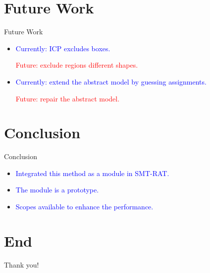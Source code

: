 \documentclass[]{beamer}
\begin{document}

\section{Future Work}
\begin{frame}{Future Work}
    \begin{itemize}
        \item \textcolor<1>{blue}{Currently: ICP excludes boxes.}\newline
        
        \textcolor<1>{red}{Future: exclude regions different shapes.}
        \bigskip
        \bigskip
        \item \textcolor<2>{blue}{Currently: extend the abstract model by guessing assignments.}\newline
        
        \textcolor<2>{red}{Future: repair the abstract model.}
    \end{itemize} 
\end{frame}

\section{Conclusion}
\begin{frame}{Conclusion}
    \begin{itemize}
        \item \textcolor<1>{blue}{Integrated this method as a module in SMT-RAT.}
        \bigskip
        \item \textcolor<1>{blue}{The module is a prototype.}
        \bigskip
        \item \textcolor<1>{blue}{Scopes available to enhance the performance.}
    \end{itemize}
\end{frame}

\section{End}
\begin{frame}{}
    \centering  
    \huge{Thank you!}
\end{frame}
\end{document}
